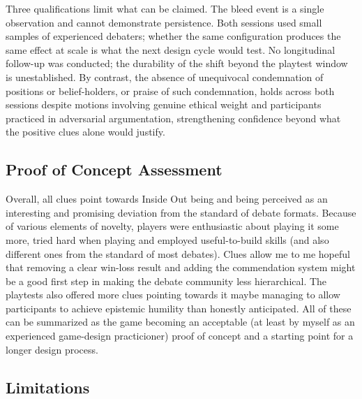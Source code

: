Three qualifications limit what can be claimed. The bleed event is a single observation and cannot demonstrate persistence. Both sessions used small samples of experienced debaters; whether the same configuration produces the same effect at scale is what the next design cycle would test. No longitudinal follow-up was conducted; the durability of the shift beyond the playtest window is unestablished. By contrast, the absence of unequivocal condemnation of positions or belief-holders, or praise of such condemnation, holds across both sessions despite motions involving genuine ethical weight and participants practiced in adversarial argumentation, strengthening confidence beyond what the positive clues alone would justify.

\subsection{Proof of Concept Assessment}

Overall, all clues point towards Inside Out being and being perceived as an interesting and promising deviation from the standard of debate formats. Because of various elements of novelty, players were enthusiastic about playing it some more, tried hard when playing and employed useful-to-build skills (and also different ones from the standard of most debates). Clues allow me to me hopeful that removing a clear win-loss result and adding the commendation system might be a good first step in making the debate community less hierarchical. The playtests also offered more clues pointing towards it maybe managing to allow participants to achieve epistemic humility than honestly anticipated. All of these can be summarized as the game becoming an acceptable (at least by myself as an experienced game-design practicioner) proof of concept and a starting point for a longer design process.


\subsection{Limitations}

